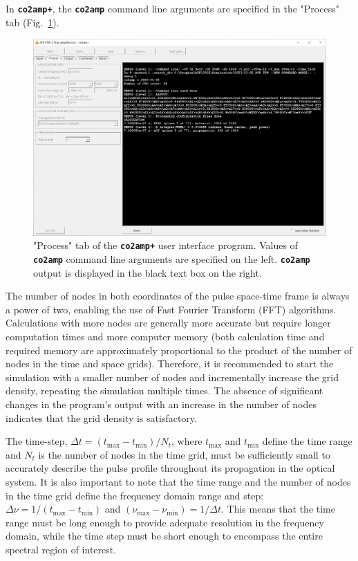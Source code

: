 \documentclass{report}
\begin{document}
In \textbf{\texttt{co2amp+}}, the \textbf{\texttt{co2amp}} command line arguments are specified in the "Process" tab (Fig.~\ref{fig:gui-process}).
\begin{figure}[ht]
 \centering
 \includegraphics[width=14cm]{images/gui-process}
 \caption{"Process" tab of the \textbf{\texttt{co2amp+}} user interface program. Values of \textbf{\texttt{co2amp}} command line arguments are specified on the left. \textbf{\texttt{co2amp}} output is displayed in the black text box on the right.}
 \label{fig:gui-process}
\end{figure}
The number of nodes in both coordinates of the pulse space-time frame is always a power of two, enabling the use of Fast Fourier Transform (FFT) algorithms. Calculations with more nodes are generally more accurate but require longer computation times and more computer memory (both calculation time and required memory are approximately proportional to the product of the number of nodes in the time and space grids). Therefore, it is recommended to start the simulation with a smaller number of nodes and incrementally increase the grid density, repeating the simulation multiple times. The absence of significant changes in the program’s output with an increase in the number of nodes indicates that the grid density is satisfactory.

The time-step, \( \Delta t = (t_{\text{max}} - t_{\text{min}}) / N_t \), where \( t_{\text{max}} \) and \( t_{\text{min}} \) define the time range and \( N_t \) is the number of nodes in the time grid, must be sufficiently small to accurately describe the pulse profile throughout its propagation in the optical system. It is also important to note that the time range and the number of nodes in the time grid define the frequency domain range and step: \( \Delta\nu = 1 / (t_{\text{max}} - t_{\text{min}}) \) and \( (\nu_{\text{max}} - \nu_{\text{min}}) = 1 / \Delta t \). This means that the time range must be long enough to provide adequate resolution in the frequency domain, while the time step must be short enough to encompass the entire spectral region of interest.
\end{document}
